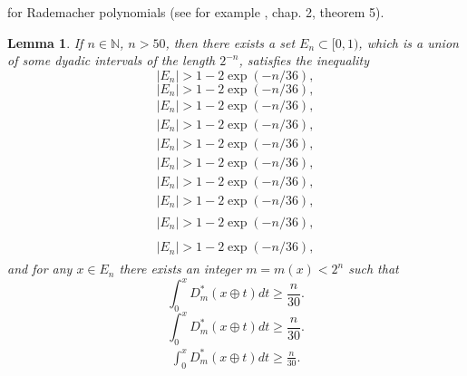 \documentclass{amsart}
\newtheorem{lemma}{Lemma}
\numberwithin{equation}{section}
\begin{document}
for Rademacher polynomials (see for example \cite{KaSa}, chap. 2, theorem 5).
\begin{lemma}\label{L2}
If $n\in {\ensuremath{\mathbb N}}$, $n>50$, then there exists a set $E_n\subset [0,1)$, which is a union of some dyadic intervals of the length $2^{-n}$, satisfies
the inequality
{
\begin{equation*} \label{a27}
|E_n|>1-2\exp(-n/36),
 \end{equation*}\fi  
{}\begin{equation}\label{a27}
|E_n|>1-2\exp(-n/36),
\end{equation}\fi   
{}\begin{align*}\label{a27}
|E_n|>1-2\exp(-n/36),
\end{align*}\fi   
{}\begin{align}\label{a27}
|E_n|>1-2\exp(-n/36),
\end{align}\fi    
{}\begin{gather*}\label{a27}
|E_n|>1-2\exp(-n/36),
\end{gather*}\fi  
{}\begin{gather}\label{a27}
|E_n|>1-2\exp(-n/36),
\end{gather}\fi   
{}\begin{multline*}\label{a27}
|E_n|>1-2\exp(-n/36),
\end{multline*}\fi  
{}\begin{multline}\label{a27}
|E_n|>1-2\exp(-n/36),
\end{multline}\fi  
{}\begin{multline*}\begin{split}\label{a27}
|E_n|>1-2\exp(-n/36),
\end{split}\end{multline*}\fi
{}\begin{multline}\begin{split}\label{a27}
|E_n|>1-2\exp(-n/36),
\end{split}\end{multline}\fi
}
and for any $x\in E_n$ there exists an integer $m=m(x)<2^n$ such that 
{
\begin{equation*} \label{a20}
\int_0^x D_m^*(x\oplus t)dt\ge \frac{n}{30}.
 \end{equation*}\fi  
{}\begin{equation}\label{a20}
\int_0^x D_m^*(x\oplus t)dt\ge \frac{n}{30}.
\end{equation}\fi   
{}\begin{align*}\label{a20}
\int_0^x D_m^*(x\oplus t)dt\ge \frac{n}{30}.

\end{align*}}
\end{lemma}
\end{document}
